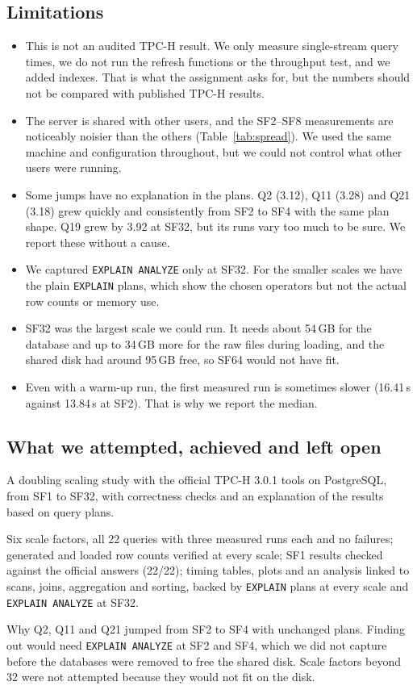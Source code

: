\documentclass[11pt,a4paper]{article}
\newcommand{\file}[1]{\texttt{#1}}
\begin{document}
\subsection{Limitations}

\begin{itemize}
\item This is not an audited TPC-H result. We only measure single-stream
query times, we do not run the refresh functions or the throughput test, and
we added indexes. That is what the assignment asks for, but the numbers should
not be compared with published TPC-H results.
\item The server is shared with other users, and the SF2--SF8 measurements are
noticeably noisier than the others (Table~\ref{tab:spread}). We used the same
machine and configuration throughout, but we could not control what other
users were running.
\item Some jumps have no explanation in the plans. Q2 (3.12), Q11 (3.28) and
Q21 (3.18) grew quickly and consistently from SF2 to SF4 with the same plan
shape. Q19 grew by 3.92 at SF32, but its runs vary too much to be sure. We
report these without a cause.
\item We captured \file{EXPLAIN ANALYZE} only at SF32. For the smaller scales
we have the plain \file{EXPLAIN} plans, which show the chosen operators but
not the actual row counts or memory use.
\item SF32 was the largest scale we could run. It needs about 54\,GB for the
database and up to 34\,GB more for the raw files during loading, and the
shared disk had around 95\,GB free, so SF64 would not have fit.
\item Even with a warm-up run, the first measured run is sometimes slower
(16.41\,s against 13.84\,s at SF2). That is why we report the median.
\end{itemize}

\subsection{What we attempted, achieved and left open}

\begin{description}[style=nextline]
\item[Attempted] A doubling scaling study with the official TPC-H 3.0.1 tools
on PostgreSQL, from SF1 to SF32, with correctness checks and an explanation
of the results based on query plans.
\item[Achieved] Six scale factors, all 22 queries with three measured runs
each and no failures; generated and loaded row counts verified at every scale;
SF1 results checked against the official answers (22/22); timing tables,
plots and an analysis linked to scans, joins, aggregation and sorting, backed
by \file{EXPLAIN} plans at every scale and \file{EXPLAIN ANALYZE} at SF32.
\item[Left open] Why Q2, Q11 and Q21 jumped from SF2 to SF4 with unchanged
plans. Finding out would need \file{EXPLAIN ANALYZE} at SF2 and SF4, which we
did not capture before the databases were removed to free the shared disk.
Scale factors beyond 32 were not attempted because they would not fit on the
disk.
\end{description}
\end{document}
